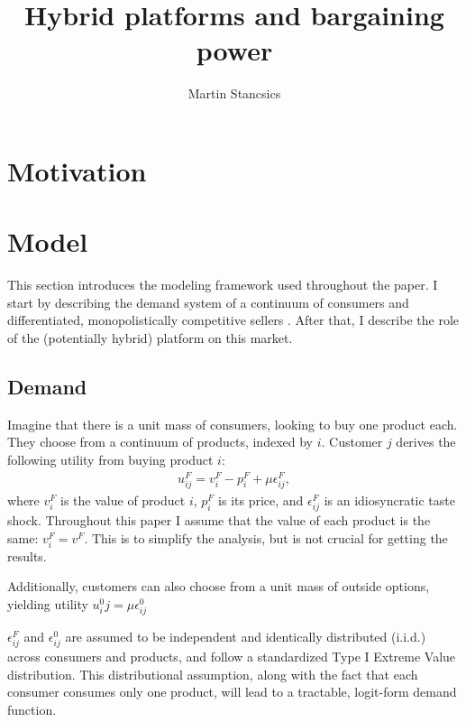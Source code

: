 \documentclass[a4paper]{article}
\title{Hybrid platforms and bargaining power}
\author{Martin Stancsics}
\begin{document}
\maketitle

\begin{abstract}
\end{abstract}


\section{Motivation}


\section{Model}
\label{sec:model}

This section introduces the modeling framework used throughout the paper.
I start by describing the demand system of a continuum of consumers and differentiated, monopolistically competitive sellers \parencite[]{anderson2021hybrid}.
After that, I describe the role of the (potentially hybrid) platform on this market.

\subsection{Demand}

Imagine that there is a unit mass of consumers, looking to buy one product each.
They choose from a continuum of products, indexed by $i$.
Customer $j$ derives the following utility from buying product $i$:
\begin{align*}
    u^F_{ij} = v^F_i - p^F_i + \mu\epsilon^F_{ij},
\end{align*}
where $v^F_i$ is the value of product $i$, $p^F_i$ is its price, and $\epsilon^F_{ij}$ is an idiosyncratic taste shock.
Throughout this paper I assume that the value of each product is the same: $v^F_i = v^F$.
This is to simplify the analysis, but is not crucial for getting the results.  %

Additionally, customers can also choose from a unit mass of outside options, yielding utility $u^0_ij = \mu\epsilon^0_{ij}$

$\epsilon^F_{ij}$ and $\epsilon^0_{ij}$ are assumed to be independent and identically distributed (i.i.d.) across consumers and products, and follow a standardized Type I Extreme Value distribution. This distributional assumption, along with the fact that each consumer consumes only one product, will lead to a tractable, logit-form demand function.
\end{document}
